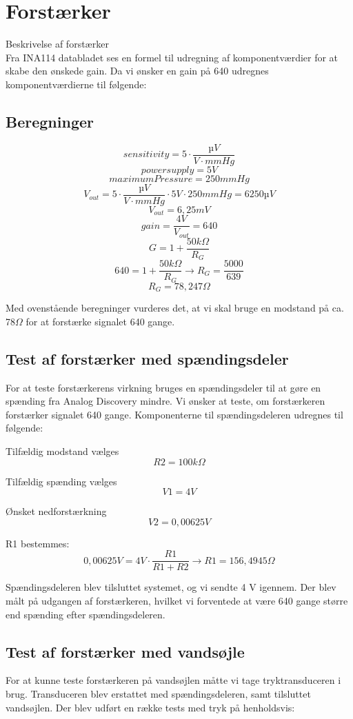 \section{Forstærker}
Beskrivelse af forstærker \\
Fra INA114 databladet ses en formel til udregning af komponentværdier for at skabe den ønskede gain. Da vi ønsker en gain på 640 udregnes komponentværdierne til følgende:

\subsection{Beregninger}
\vspace{0.5 cm}
\[ sensitivity = 5\cdot\frac{µV}{V\cdot mmHg} \]
\[ powersupply = 5V \]
\[ maximumPressure = 250 mmHg \]
\[ V_{out} =5\cdot\frac{µV}{V\cdot mmHg} \cdot 5V \cdot 250 mmHg = 6250 µV \]
\[ V_{out} =6,25 mV \]
\[ gain = \frac{4V}{V_{out}} = 640 \]
\[ G = 1+\frac{50k\Omega}{R_{G}} \]
\[ 640 = 1+\frac{50k\Omega}{R_{G}} \rightarrow R_{G}=\frac{5000}{639}\]
\[ R_{G} = 78,247 \Omega \]

Med ovenstående beregninger vurderes det, at vi skal bruge en modstand på ca. 78$\Omega$ for at forstærke signalet 640 gange.

\vspace{0.5 cm}

\subsection{Test af forstærker med spændingsdeler}
\vspace{0.2 cm}
For at teste forstærkerens virkning bruges en spændingsdeler til at gøre en spænding fra Analog Discovery mindre. Vi ønsker at teste, om forstærkeren forstærker signalet 640 gange. Komponenterne til spændingsdeleren udregnes til følgende:

Tilfældig modstand vælges
\[ R2=100 k\Omega \]

Tilfældig spænding vælges
\[ V1 = 4V \]

Ønsket nedforstærkning
\[ V2=0,00625V\]

R1 bestemmes:
\[ 0,00625V = 4V\cdot \frac{R1}{R1+R2}\rightarrow R1 = 156,4945 \Omega\]

Spændingsdeleren blev tilsluttet systemet, og vi sendte 4 V igennem. Der blev målt på udgangen af forstærkeren, hvilket vi forventede at være 640 gange større end spænding efter spændingsdeleren. 
\clearpage


\subsection{Test af forstærker med vandsøjle}
For at kunne teste forstærkeren på vandsøjlen måtte vi tage tryktransduceren i brug. Transduceren blev erstattet med spændingsdeleren, samt tilsluttet vandsøjlen.
Der blev udført en række tests med tryk på henholdsvis:

